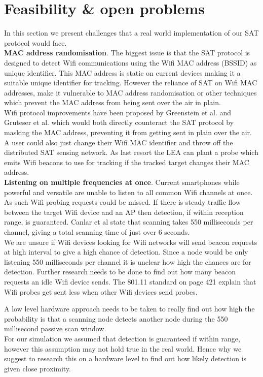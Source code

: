 \documentclass[10pt,titlepage]{article}
\begin{document}
\section{Feasibility \& open problems}
In this section we present challenges that a real world implementation of our SAT protocol would face.\\

\textbf{MAC address randomisation}. The biggest issue is that the SAT protocol is designed to detect Wifi communications using the Wifi MAC address (BSSID) as unique identifier. This MAC address is static on current devices making it a suitable unique identifier for tracking. However the reliance of SAT on Wifi MAC addresses, make it vulnerable to MAC address randomisation or other techniques which prevent the MAC address from being sent over the air in plain.\\
Wifi protocol improvements have been proposed by Greenstein et al. \cite{GREENSTEIN} and Gruteser et al. \cite{GRUTESER} which would both directly counteract the SAT protocol by masking the MAC address, preventing it from getting sent in plain over the air. A user could also just change their Wifi MAC identifier and throw off the distributed SAT sensing network. As last resort the LEA can plant a probe which emits Wifi beacons to use for tracking if the tracked target changes their MAC address.\\

\textbf{Listening on multiple frequencies at once}. Current smartphones while powerful and versatile are unable to listen to all common Wifi channels at once. As such Wifi probing requests could be missed. If there is steady traffic flow between the target Wifi device and an AP then detection, if within reception range, is guaranteed. Canlar et al \cite{SAT} state that scanning takes 550 milliseconds per channel, giving a total scanning time of just over 6 seconds.\\
We are unsure if Wifi devices looking for Wifi networks will send beacon requests at high interval to give a high chance of detection. Since a node would be only listening 550 milliseconds per channel it is unclear how high the chances are for detection. Further research needs to be done to find out how many beacon requests an idle Wifi device sends.
The 801.11 standard \cite{80211} on page 421 explain that Wifi probes get sent less when other Wifi devices send probes.


 A low level hardware approach needs to be taken to really find out how high the probability is that a scanning node detects another node during the 550 millisecond passive scan window.\\
For our simulation we assumed that detection is guaranteed if within range, however this assumption may not hold true in the real world. Hence why we suggest to research this on a hardware level to find out how likely detection is given close proximity.\\
\end{document}
